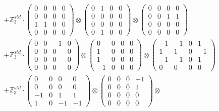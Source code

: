\documentclass{article}
\begin{document}
{\begin{align}
        &+ \label{Rs16-Rc11-Solution-18-c22} \mathbb{Z}_3^{std} \cdot 
            \begin{pmatrix} 0 & 0 & 0 & 0 \\ 0 & 0 & 0 & 0 \\ 1 & 1 & 0 & 0 \\ 0 & 0 & 0 & 0 \end{pmatrix} \otimes 
            \begin{pmatrix} 0 & 1 & 0 & 0 \\ 0 & 0 & 0 & 0 \\ 0 & 0 & 0 & 0 \\ 0 & 1 & 0 & 0 \end{pmatrix} \otimes 
            \begin{pmatrix} 0 & 0 & 0 & 0 \\ 0 & 0 & 1 & 1 \\ 0 & 0 & 0 & 0 \\ 0 & 0 & 0 & 0 \end{pmatrix} \\ 
        &+ \label{Rs16-Rc11-Solution-18-c23} \mathbb{Z}_3^{std} \cdot 
            \begin{pmatrix} 0 & 0 & -1 & 0 \\ 0 & 0 & 0 & 0 \\ 0 & 0 & 0 & 0 \\ 0 & 0 & 0 & 0 \end{pmatrix} \otimes 
            \begin{pmatrix} 0 & 0 & 0 & 0 \\ 1 & 0 & 0 & 0 \\ 1 & 0 & 0 & 0 \\ -1 & 0 & 0 & 0 \end{pmatrix} \otimes 
            \begin{pmatrix} -1 & -1 & 0 & 1 \\ 1 & 1 & 0 & -1 \\ -1 & -1 & 0 & 1 \\ 0 & 0 & 0 & 0 \end{pmatrix} \\ 
        &+ \label{Rs16-Rc11-Solution-18-c24} \mathbb{Z}_3^{std} \cdot 
            \begin{pmatrix} 0 & 0 & 0 & 0 \\ 0 & 0 & 0 & 0 \\ -1 & 0 & 1 & 1 \\ 1 & 0 & -1 & -1 \end{pmatrix} \otimes 
            \begin{pmatrix} 0 & 0 & 0 & -1 \\ 0 & 0 & 0 & 1 \\ 0 & 0 & 0 & 0 \\ 0 & 0 & 0 & 0 \end{pmatrix} \otimes 

\end{align}}
\end{document}
